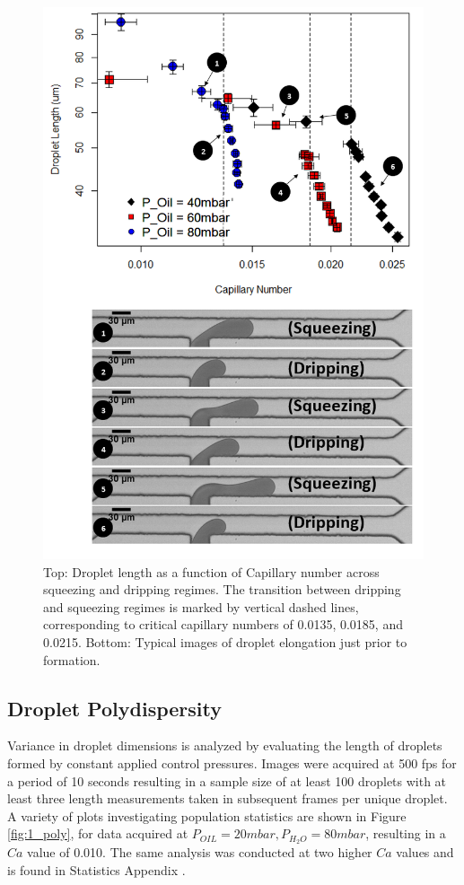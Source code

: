 \begin{figure}[H]
\centering 
\includegraphics[width=0.75\columnwidth]{regimes2.PNG} 
\caption[Droplet length as a function of Capillary number across squeezing and dripping regimes]{Top: Droplet length as a function of Capillary number across squeezing and dripping regimes. The transition between dripping and squeezing regimes is marked by vertical dashed lines, corresponding to critical capillary numbers of 0.0135, 0.0185, and 0.0215. Bottom: Typical images of droplet elongation just prior to formation.} 
\label{fig:regimes2} 
\end{figure}

\clearpage

\subsection{Droplet Polydispersity}

Variance in droplet dimensions is analyzed by evaluating the length of droplets formed by constant applied control pressures. Images were acquired at 500 fps for a period of 10 seconds resulting in a sample size of at least 100 droplets with at least three length measurements taken in subsequent frames per unique droplet. A variety of plots investigating population statistics are shown in Figure \vref{fig:1_poly}, for data acquired at $P_{OIL} = 20mbar,  P_{H_2O} = 80mbar$, resulting in a $Ca$ value of 0.010. The same analysis was conducted at two higher $Ca$ values and is found in Statistics Appendix .


